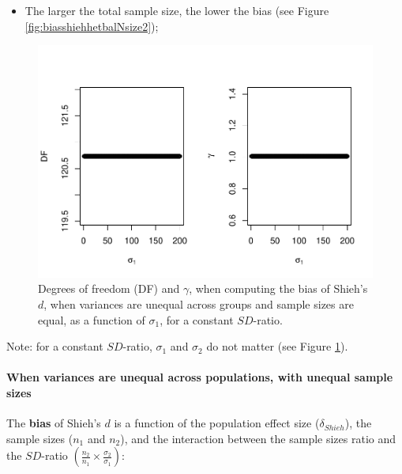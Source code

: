 \documentclass[
  english,
  man,mask]{apa6}
\providecommand{\tightlist}{%
  \setlength{\itemsep}{0pt}\setlength{\parskip}{0pt}}
\let\oldparagraph\paragraph
\renewcommand{\paragraph}[1]{\oldparagraph{#1}\mbox{}}
\begin{document}
\begin{itemize}
\tightlist
\item
  The larger the total sample size, the lower the bias (see Figure \ref{fig:biasshiehhetbalNsize2});
\end{itemize}

\begin{figure}
\centering
\includegraphics{Theoretical-Bias-of-all-estimators-as-a-function-of-population-parameters_files/figure-latex/biasshiehhetbalvariance2-1.pdf}
\caption{\label{fig:biasshiehhetbalvariance2}Degrees of freedom (DF) and \(\gamma\), when computing the bias of Shieh's \(d\), when variances are unequal across groups and sample sizes are equal, as a function of \(\sigma_1\), for a constant \(SD\)-ratio.}
\end{figure}

Note: for a constant \(SD\)-ratio, \(\sigma_1\) and \(\sigma_2\) do not matter (see Figure \ref{fig:biasshiehhetbalvariance2}).

\hypertarget{when-variances-are-unequal-across-populations-with-unequal-sample-sizes-1}{%
\paragraph{When variances are unequal across populations, with unequal sample sizes}\label{when-variances-are-unequal-across-populations-with-unequal-sample-sizes-1}}

The \textbf{bias} of Shieh's \(d\) is a function of the population effect size (\(\delta_{Shieh}\)), the sample sizes (\(n_1\) and \(n_2\)), and the interaction between the sample sizes ratio and the \(SD\)-ratio \(\left(\frac{n_2}{n_1}\times\frac{\sigma_2}{\sigma_1} \right)\):
\end{document}
